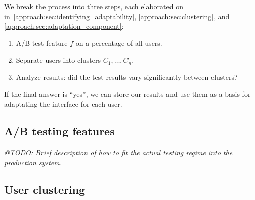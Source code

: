 We break the process into three steps, each elaborated on in~\ref{approach:sec:identifying_adaptability}, \ref{approach:sec:clustering}, and \ref{approach:sec:adaptation_component}:

\begin{enumerate}
  \item A/B test feature $f$ on a percentage of all users.
  \item Separate users into clusters $C_1, \ldots, C_n$.
  \item Analyze results: did the test results vary significantly between clusters?
\end{enumerate}

If the final answer is ``yes'', we can store our results and use them as a basis for adaptating the interface for each user.

\subsection{A/B testing features} %
\label{eval:sec:a_b_testing_features}

\emph{@TODO: Brief description of how to fit the actual testing regime into the production system.}


\subsection{User clustering} %
\label{eval:sec:clustering_of_users}


